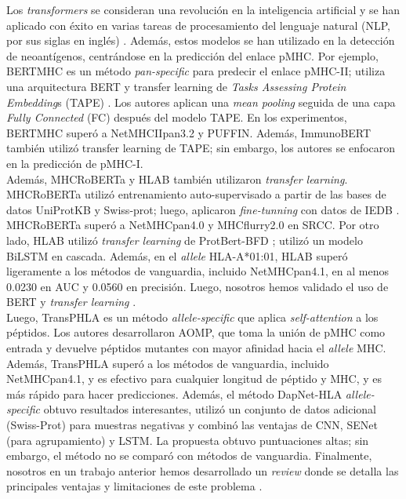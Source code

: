 \documentclass[a4paper]{article}
\begin{document}
Los \textit{transformers} se consideran una revolución en la inteligencia artificial y se han aplicado con éxito en varias tareas de procesamiento del lenguaje natural (NLP, por sus siglas en inglés) \citep{patwardhan2023transformers}. Además, estos modelos se han utilizado en la detección de neoantígenos, centrándose en la predicción del enlace pMHC. Por ejemplo, BERTMHC \citep{cheng2021bertmhc} es un método 	\textit{pan-specific} para predecir el enlace pMHC-II; utiliza una arquitectura BERT y transfer learning de \textit{Tasks Assessing Protein Embedding}s (TAPE) \citep{rao2019evaluating}. Los autores aplican una \textit{mean pooling} seguida de una capa \textit{Fully Connected} (FC) después del modelo TAPE. En los experimentos, BERTMHC superó a NetMHCIIpan3.2 y PUFFIN. Además, ImmunoBERT \citep{gasser2021interpreting} también utilizó transfer learning de TAPE; sin embargo, los autores se enfocaron en la predicción de pMHC-I.\\

Además, MHCRoBERTa \citep{wang2022mhcroberta} y HLAB \citep{zhang2022hlab} también utilizaron \textit{transfer learning}. MHCRoBERTa utilizó entrenamiento auto-supervisado a partir de las bases de datos UniProtKB y Swiss-prot; luego, aplicaron \textit{fine-tunning} con datos de IEDB \citep{vita2019immune}. MHCRoBERTa superó a NetMHCpan4.0 y MHCflurry2.0 en SRCC. Por otro lado, HLAB \citep{zhang2022hlab} utilizó \textit{transfer learning} de ProtBert-BFD \citep{elnaggar2021prottrans}; utilizó un modelo BiLSTM en cascada. Además, en el \textit{allele} HLA-A*01:01, HLAB superó ligeramente a los métodos de vanguardia, incluido NetMHCpan4.1, en al menos 0.0230 en AUC y 0.0560 en precisión. Luego, nosotros hemos validado el uso de BERT y \textit{transfer learning} \citep{arceda2023neoantigen}.\\

Luego, TransPHLA \citep{chu2022transformer} es un método \textit{allele-specific} que aplica \textit{self-attention} a los péptidos. Los autores desarrollaron AOMP, que toma la unión de pMHC como entrada y devuelve péptidos mutantes con mayor afinidad hacia el \textit{allele} MHC. Además, TransPHLA superó a los métodos de vanguardia, incluido NetMHCpan4.1, y es efectivo para cualquier longitud de péptido y MHC, y es más rápido para hacer predicciones. Además, el método DapNet-HLA \textit{allele-specific} \citep{jing2023dapnet} obtuvo resultados interesantes, utilizó un conjunto de datos adicional (Swiss-Prot) para muestras negativas y combinó las ventajas de CNN, SENet (para agrupamiento) y LSTM. La propuesta obtuvo puntuaciones altas; sin embargo, el método no se comparó con métodos de vanguardia. Finalmente, nosotros en un trabajo anterior hemos desarrollado un \textit{review} donde se detalla las principales ventajas y limitaciones de este problema \citep{machaca2023deep}.\\
\end{document}
